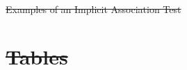 \documentclass[12pt,english]{article}
\providecommand{\DIFdeltex}[1]{{\protect\color{red}\sout{#1}}}                      %
\providecommand{\DIFdelFL}[1]{\DIFdel{#1}} %
\providecommand{\DIFdel}[1]{\texorpdfstring{\DIFdeltex{#1}}{}} %
\begin{document}
{%
\DIFdelFL{Examples of an Implicit Association Test}}
\DIFdelFL{\label{fig:iatexamples}
}%


\section*{\DIFdel{Tables}} %
\DIFdel{\label{sec:tabs-ap}
}%
\end{document}
